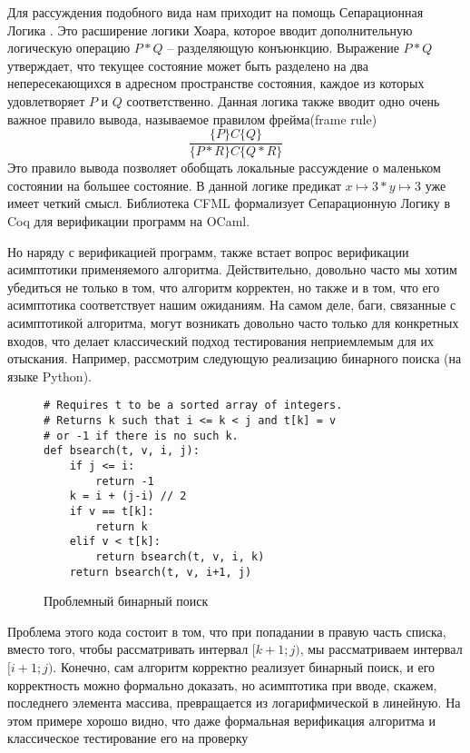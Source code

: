 \par
Для рассуждения подобного вида нам приходит на помощь Сепарационная Логика \cite{SepLogic}. Это расширение логики Хоара, которое
вводит дополнительную логическую операцию $P \ast Q$ -- разделяющую конъюнкцию. Выражение $P \ast Q$ утверждает, что текущее состояние
может быть разделено на два непересекающихся в адресном пространстве состояния, каждое из которых удовлетворяет $P$ и $Q$ соответственно.
Данная логика также вводит одно очень важное правило вывода, называемое правилом фрейма(frame rule)
$$
    \frac{\{P\} C\{Q\}}{\{P * R\} C\{Q * R\}}
$$
Это правило вывода позволяет обобщать локальные рассуждение о маленьком состоянии на большее состояние. В данной логике предикат
$x \mapsto 3 \ast y \mapsto 3$ уже имеет четкий смысл. Библиотека CFML \cite{CFML} формализует Сепарационную Логику в Coq для верификации
программ на OCaml.
\par
Но наряду с верификацией программ, также встает вопрос верификации асимптотики применяемого алгоритма. Действительно, довольно часто
мы хотим убедиться не только в том, что алгоритм корректен, но также и в том, что его асимптотика соответствует нашим ожиданиям.
На самом деле, баги, связанные с асимптотикой алгоритма, могут возникать довольно часто только для конкретных входов, что делает
классический подход тестирования неприемлемым для их отыскания. Например, рассмотрим следующую реализацию бинарного поиска
(на языке Python).
\begin{figure}[H]
    \caption{Проблемный бинарный поиск}
    \label{code:bsearch}
    \begin{verbatim}
# Requires t to be a sorted array of integers.
# Returns k such that i <= k < j and t[k] = v
# or -1 if there is no such k.
def bsearch(t, v, i, j):
    if j <= i:
        return -1
    k = i + (j-i) // 2
    if v == t[k]:
        return k
    elif v < t[k]:
        return bsearch(t, v, i, k)
    return bsearch(t, v, i+1, j)
\end{verbatim}
\end{figure}
Проблема этого кода состоит в том, что при попадании в правую часть списка, вместо того, чтобы рассматривать интервал $[k+1;j)$, мы
рассматриваем интервал \\
$[i+1;j)$. Конечно, сам алгоритм корректно реализует бинарный поиск, и его корректность можно формально доказать,
но асимптотика при вводе, скажем, последнего элемента массива, превращается из логарифмической в линейную.
На этом примере хорошо видно, что даже формальная верификация алгоритма и классическое тестирование его на проверку
